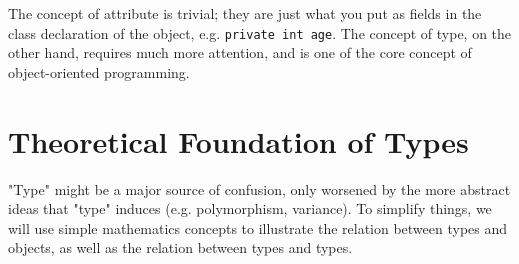\documentclass[12pt]{article}
\theoremstyle{definition}
\newcommand{\code}[1]{\colorbox{codegray}{\texttt{#1}}}
\begin{document}
	The concept of attribute is trivial; they are just what you put as fields in the class declaration of the object, e.g. \code{private int age}. The concept of type, on the other hand, requires much more attention, and is one of the core concept of object-oriented programming.
	
	\section{Theoretical Foundation of Types}
	
	"Type" might be a major source of confusion, only worsened by the more abstract ideas that "type" induces (e.g. polymorphism, variance). To simplify things, we will use simple mathematics concepts to illustrate the relation between types and objects, as well as the relation between types and types.
	
\end{document}
